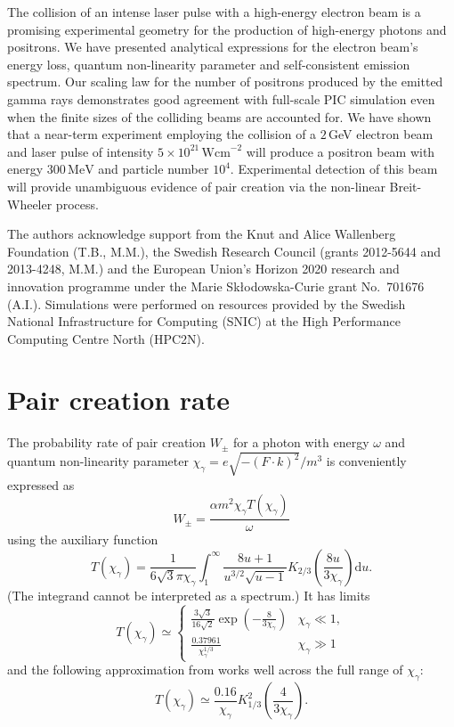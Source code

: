\documentclass[reprint,superscriptaddress,amsmath,amssymb,aps,pra]{revtex4-1}
\newcommand{\Wcm}{\mathrm{Wcm}}
\newcommand{\rmd}{\mathrm{d}}
\newcommand{\MeV}{\mathrm{MeV}}
\begin{document}
The collision of an intense laser pulse with a high-energy electron beam 
is a promising experimental geometry for the production of
high-energy photons and positrons. We have presented analytical
expressions for the electron beam's energy loss, quantum non-linearity parameter
and self-consistent emission spectrum.
Our scaling law for the number of positrons produced by the emitted gamma rays
demonstrates good agreement with full-scale PIC simulation even when
the finite sizes of the colliding beams are accounted for.
We have shown that a near-term
experiment employing the collision of a $2\,$GeV electron beam and laser pulse
of intensity $5\times10^{21}\,\Wcm^{-2}$ will produce a
positron beam with energy $300\,\MeV$ and particle number $10^4$.
Experimental detection of this beam will provide unambiguous evidence
of pair creation via the non-linear Breit-Wheeler process.

\begin{acknowledgments}
The authors acknowledge support from the Knut and Alice
Wallenberg Foundation (T.B., M.M.), the Swedish Research Council
(grants 2012-5644 and 2013-4248, M.M.) and the European Union's
Horizon 2020 research and innovation programme under the Marie
Sk{\l}odowska-Curie grant No.~701676 (A.I.).
Simulations were performed on resources provided by the Swedish National
Infrastructure for Computing (SNIC) at the High Performance Computing
Centre North (HPC2N).
\end{acknowledgments}

\appendix
\section{Pair creation rate}
\label{app:pcr}

The probability rate of pair creation $W_\pm$ for a photon with energy $\omega$ and
quantum non-linearity parameter $\chi_\gamma = e \sqrt{-(F\cdot k)^2} / m^3$ is conveniently expressed as
	\begin{equation}
	W_\pm = \frac{\alpha m^2 \chi_\gamma T(\chi_\gamma)}{\omega}
	\end{equation}
using the auxiliary function~\cite{Erber,BKS}
	\begin{equation}
	T(\chi_\gamma) =
		\frac{1}{6\sqrt{3}\pi \chi_\gamma}
		\int_1^\infty \!
			\frac{8u+1}{u^{3/2}\sqrt{u-1}}
			K_{2/3} \!\left( \frac{8u}{3\chi_\gamma} \right)
		\rmd u.
	\end{equation}
(The integrand cannot be interpreted as a spectrum.) It has limits
	\begin{equation}
	T(\chi_\gamma) \simeq
		\begin{cases}
		\frac{3\sqrt{3}}{16\sqrt{2}} \exp\!\left( -\frac{8}{3\chi_\gamma} \right) & \chi_\gamma \ll 1, \\
		\frac{0.37961}{\chi_\gamma^{1/3}} & \chi_\gamma \gg 1
		\end{cases}
	\end{equation}
and the following approximation from \citet{Erber} works well across the
full range of $\chi_\gamma$:
	\begin{equation}
	T(\chi_\gamma) \simeq
		\frac{0.16}{\chi_\gamma}
		K_{1/3}^2 \!\left( \frac{4}{3\chi_\gamma} \right).
	\end{equation}
\end{document}
